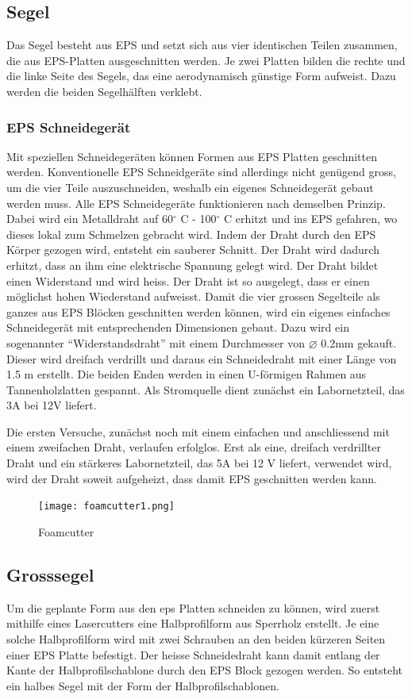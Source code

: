 \subsection{Segel}
Das Segel besteht aus EPS und setzt sich aus vier identischen Teilen zusammen, die aus EPS-Platten ausgeschnitten werden. Je zwei Platten bilden die rechte und die linke Seite des Segels, das eine aerodynamisch günstige Form aufweist. Dazu werden die beiden Segelhälften verklebt.  
\subsubsection*{EPS Schneidegerät}
Mit speziellen Schneidegeräten können Formen aus EPS Platten geschnitten werden. Konventionelle EPS Schneidgeräte sind allerdings nicht genügend gross, um die vier Teile auszuschneiden, weshalb ein eigenes Schneidegerät gebaut werden muss. Alle EPS Schneidegeräte funktionieren nach demselben Prinzip. Dabei wird ein Metalldraht  auf  60$^\circ$ C - 100$^\circ$ C erhitzt und ins EPS gefahren, wo dieses lokal zum Schmelzen gebracht wird. Indem der Draht durch den EPS Körper gezogen wird, entsteht ein sauberer Schnitt. Der Draht wird dadurch erhitzt, dass an ihm eine elektrische Spannung gelegt wird. Der Draht bildet einen Widerstand und wird heiss. Der Draht ist so ausgelegt, dass er einen möglichst hohen Wiederstand aufweisst. 
Damit die  vier grossen Segelteile als ganzes aus EPS Blöcken geschnitten werden können, wird ein eigenes einfaches Schneidegerät mit entsprechenden Dimensionen gebaut.  Dazu wird ein sogenannter \enquote{Widerstandsdraht} mit einem Durchmesser von $\varnothing$ 0.2mm gekauft. Dieser wird dreifach verdrillt und daraus ein Schneidedraht mit einer Länge von 1.5 m erstellt. Die beiden Enden werden in einen U-förmigen Rahmen aus Tannenholzlatten gespannt. Als Stromquelle dient zunächst ein Labornetzteil, das 3A bei 12V liefert. 

Die ersten Versuche, zunächst noch mit einem einfachen und anschliessend mit einem zweifachen Draht, verlaufen erfolglos. Erst als eine, dreifach verdrillter Draht und ein stärkeres Labornetzteil, das 5A bei 12 V liefert, verwendet wird, wird der Draht soweit aufgeheizt, dass damit EPS geschnitten werden kann.     
\begin{figure}[H]
    \centering
    \texttt{[image: foamcutter1.png]}
    \caption{Foamcutter}
    \label{fig:enter-label}
\end{figure}
\subsection*{Grosssegel}
Um die geplante Form aus den \ac{eps} Platten schneiden zu können, wird zuerst mithilfe eines Lasercutters eine Halbprofilform aus Sperrholz erstellt. Je eine solche Halbprofilform wird mit zwei  Schrauben an den beiden kürzeren Seiten einer EPS Platte  befestigt. Der heisse Schneidedraht kann damit entlang der Kante der Halbprofilschablone durch den EPS Block gezogen werden. So entsteht ein halbes Segel mit der Form der Halbprofilschablonen. \\


